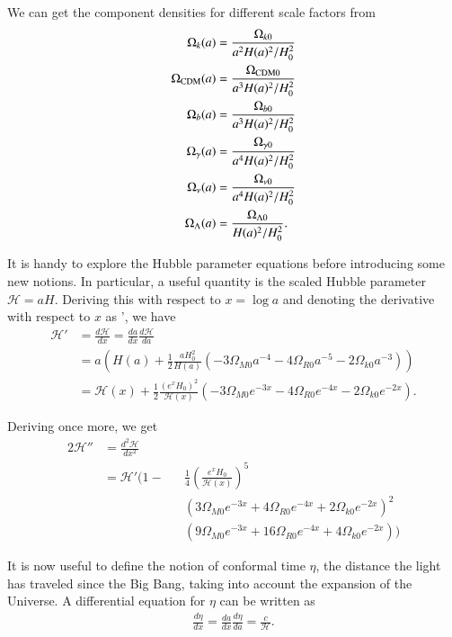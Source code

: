 \documentclass{aa}
\begin{document}
We can get the component densities for different scale factors from
\begin{equation}
\label{eq:omegas}
\begin{aligned}
\Omega_{k}(a) &= \frac{\Omega_{k0}}{a^2H(a)^2/H_0^2}\\
\Omega_{\rm CDM}(a) &= \frac{\Omega_{\rm CDM 0}}{a^3H(a)^2/H_0^2} \\
\Omega_b(a) &= \frac{\Omega_{b 0}}{a^3H(a)^2/H_0^2} \\
\Omega_\gamma(a) &= \frac{\Omega_{\gamma 0}}{a^4H(a)^2/H_0^2} \\
\Omega_{\nu}(a) &= \frac{\Omega_{\nu 0}}{a^4H(a)^2/H_0^2} \\
\Omega_{\Lambda}(a) &= \frac{\Omega_{\Lambda 0}}{H(a)^2/H_0^2}.
\end{aligned}
\end{equation}

It is handy to explore the Hubble parameter equations before introducing some new notions. In particular, a useful quantity is the scaled Hubble parameter $\mathcal H = aH$. Deriving this with respect to $x = \log a$ and denoting the derivative with respect to $x$ as ', we have
\begin{align}
    \mathcal H' &= \frac{d\mathcal H}{dx} = \frac{da}{dx}\frac{d\mathcal H}{da}\\ 
    &= a\left( H(a) + \frac{1}{2}\frac{aH_0^2}{ H(a)} (-3\Omega_{M0} a^{-4} - 4\Omega_{R0}a^{-5}-2\Omega_{k0}a^{-3})\right)\\
    &= \mathcal H(x) +\frac{1}{2}\frac{(e^xH_0)^2}{\mathcal H(x)}(-3\Omega_{M0} e^{-3x} - 4 \Omega_{R0}e^{-4x}-2\Omega_{k0}e^{-2x}).
\end{align}

Deriving once more, we get
\begin{alignat*}{2}
    \mathcal H'' &= \frac{d^2\mathcal H}{dx^2}&&\\ 
    &= \mathcal H'\Bigg(1-&&\frac{1}{4}\left(\frac{e^xH_0}{\mathcal H(x)}\right)^5\\
    & &&(3\Omega_{M0}e^{-3x}+4\Omega_{R0}e^{-4x}+2\Omega_{k0}e^{-2x})^2\\
    & &&(9\Omega_{M0}e^{-3x}+16\Omega_{R0}e^{-4x}+4\Omega_{k0}e^{-2x})\Bigg)
\end{alignat*}

It is now useful to define the notion of conformal time $\eta$, the distance the light has traveled since the Big Bang, taking into account the expansion of the Universe. A differential equation for $\eta$ can be written as
\begin{align}
\frac{d\eta}{dx} = \frac{da}{dx}\frac{d\eta}{da} = \frac{c}{\mathcal{H}}.
\end{align}
\end{document}
